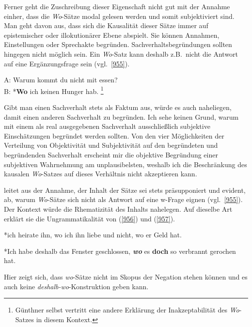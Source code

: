 {Ferner geht die Zuschreibung dieser Eigenschaft nicht gut mit der Annahme einher, dass die \textit{Wo}-Sätze modal gelesen werden und somit subjektiviert sind. Man geht davon aus, dass sich die Kausalität dieser Sätze immer auf epistemi\-scher oder illokutionärer Ebene abspielt. Sie können Annahmen, Einstellungen oder Sprechakte begründen. Sachverhaltsbegründungen sollten hingegen nicht möglich sein. Ein \textit{Wo}-Satz kann deshalb z.B.\ nicht die Antwort auf eine Ergänzungsfrage sein (vgl.\ \ref{955}).

\begin{exe}
	\ex\label{955}
	A: Warum kommt du nicht mit essen?\\
	B: *\textbf{Wo} ich keinen Hunger hab.	 			      
	\hfill\hbox{\citet[325]{Guenthner2002}}\footnote{Günthner selbst vertritt eine andere Erklärung der Inakzeptabilität des \textit{Wo}-Satzes in diesem 		Kontext.}
\end{exe} 
Gibt man einen Sachverhalt stets als Faktum aus, würde es auch naheliegen, damit einen anderen Sachverhalt zu begründen. Ich sehe keinen Grund, warum mit einem als real ausgegebenen Sachverhalt ausschließlich subjektive Einschätzungen begründet werden sollten. Von den vier Möglichkeiten der Verteilung von Objektivität und Subjektivität auf den begründeten und begründenden Sachverhalt erscheint mir die objektive Begründung einer subjektiven Wahrnehmung am unplausibelsten, weshalb ich die Beschränkung des kausalen \textit{Wo}-Satzes auf dieses Verhältnis nicht akzeptieren kann.

\citet{Guenthner2002} leitet aus der Annahme, der Inhalt der Sätze sei stets präsupponiert und evident, ab, warum \textit{Wo}-Sätze sich nicht als Antwort auf eine w-Frage eignen (vgl.\ \ref{955}). Der Kontext würde die Rhematizität des Inhalts nahelegen. Auf dieselbe Art erklärt sie die Ungrammatikalität von (\ref{956}) und (\ref{957}).

\begin{exe}
	\ex\label{956}
	*ich heirate ihn, wo ich ihn liebe und nicht, wo er Geld hat.
	\newline 	 			      
	\hbox{}\hfill\hbox{\citet[325]{Guenthner2002}}
\end{exe}

\begin{exe}
	\ex\label{957}
	*Ich habe deshalb das Fenster geschlossen, \textbf{\textit{wo}} es \textbf{doch} so verbrannt gerochen hat. 			      
\end{exe}
Hier zeigt sich, dass \textit{wo}-Sätze nicht im Skopus der Negation stehen können und es auch keine \textit{deshalb-wo}-Konstruktion geben kann.

}
